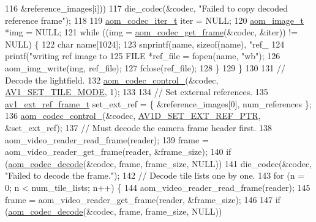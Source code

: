 \begin{DoxyCodeInclude}
{{{{116                           &reference\_images[i]))
117       die\_codec(&codec, \textcolor{stringliteral}{"Failed to copy decoded reference frame"});
118 
119     \hyperlink{group__codec_gadf9e173c9e02788a9999399edab20a02}{aom\_codec\_iter\_t} iter = NULL;
120     \hyperlink{structaom__image}{aom\_image\_t} *img = NULL;
121     \textcolor{keywordflow}{while} ((img = \hyperlink{group__decoder_ga780aad27a2728abefab725faa3bc4f79}{aom\_codec\_get\_frame}(&codec, &iter)) != NULL) \{
122       \textcolor{keywordtype}{char} name[1024];
123       snprintf(name, \textcolor{keyword}{sizeof}(name), \textcolor{stringliteral}{"ref\_%
124       printf(\textcolor{stringliteral}{"writing ref image to %
125       FILE *ref\_file = fopen(name, \textcolor{stringliteral}{"wb"});
126       aom\_img\_write(img, ref\_file);
127       fclose(ref\_file);
128     \}
129   \}
130 
131   \textcolor{comment}{// Decode the lightfield.}
132   \hyperlink{group__codec_ga51eb332a40dcacc39000ab8e0be36b79}{aom\_codec\_control\_}(&codec, \hyperlink{group__aom__decoder_gga3865fd4b3192489baa9a5c3632ebe97ba0795d8084ae8c78528c01587198df9e2}{AV1\_SET\_TILE\_MODE}, 1);
133 
134   \textcolor{comment}{// Set external references.}
135   \hyperlink{structav1__ext__ref__frame}{av1\_ext\_ref\_frame\_t} set\_ext\_ref = \{ &reference\_images[0], num\_references \};
136   \hyperlink{group__codec_ga51eb332a40dcacc39000ab8e0be36b79}{aom\_codec\_control\_}(&codec, \hyperlink{group__aom__decoder_gga3865fd4b3192489baa9a5c3632ebe97badfbe6c1ebe4039bfef4d2cfd98755add}{AV1D\_SET\_EXT\_REF\_PTR}, &set\_ext\_ref);
137   \textcolor{comment}{// Must decode the camera frame header first.}
138   aom\_video\_reader\_read\_frame(reader);
139   frame = aom\_video\_reader\_get\_frame(reader, &frame\_size);
140   \textcolor{keywordflow}{if} (\hyperlink{group__decoder_gab03fdb999d1f83a5896869a3ba5f68f7}{aom\_codec\_decode}(&codec, frame, frame\_size, NULL))
141     die\_codec(&codec, \textcolor{stringliteral}{"Failed to decode the frame."});
142   \textcolor{comment}{// Decode tile lists one by one.}
143   \textcolor{keywordflow}{for} (n = 0; n < num\_tile\_lists; n++) \{
144     aom\_video\_reader\_read\_frame(reader);
145     frame = aom\_video\_reader\_get\_frame(reader, &frame\_size);
146 
147     \textcolor{keywordflow}{if} (\hyperlink{group__decoder_gab03fdb999d1f83a5896869a3ba5f68f7}{aom\_codec\_decode}(&codec, frame, frame\_size, NULL))
}}}}}}
\end{DoxyCodeInclude}

